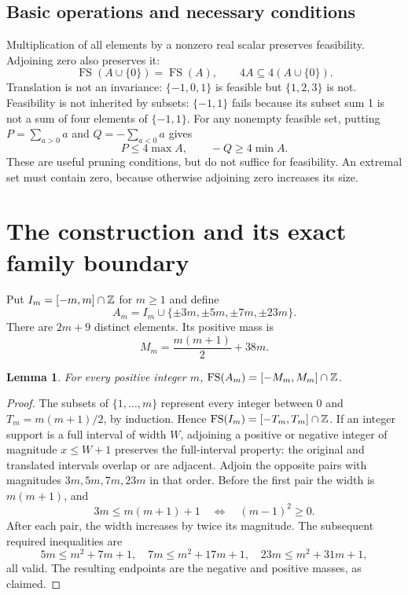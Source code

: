 \documentclass[11pt,a4paper]{article}
\newtheorem{lemma}[theorem]{Lemma}
\theoremstyle{remark}\newtheorem{remark}[theorem]{Remark}
\newcommand{\FS}{\operatorname{FS}}
\begin{document}
\subsection{Basic operations and necessary conditions}
Multiplication of all elements by a nonzero real scalar preserves feasibility. Adjoining zero also preserves it:
\[\FS(A\cup\{0\})=\FS(A),\qquad4A\subseteq4(A\cup\{0\}).\]
Translation is not an invariance: $\{-1,0,1\}$ is feasible but $\{1,2,3\}$ is not. Feasibility is not inherited by subsets: $\{-1,1\}$ fails because its subset sum 1 is not a sum of four elements of $\{-1,1\}$.
For any nonempty feasible set, putting $P=\sum_{a>0}a$ and $Q=-\sum_{a<0}a$ gives
\[P\le4\max A,\qquad -Q\ge4\min A.\]
These are useful pruning conditions, but do not suffice for feasibility. An extremal set must contain zero, because otherwise adjoining zero increases its size.

\section{The construction and its exact family boundary}
Put $I_m=[-m,m]\cap\mathbb Z$ for $m\ge1$ and define
\[ A_m=I_m\cup\{\pm3m,\pm5m,\pm7m,\pm23m\}. \]
There are $2m+9$ distinct elements. Its positive mass is
\[M_m=\frac{m(m+1)}2+38m.\]

\begin{lemma}\label{lem:fullsupport}
For every positive integer $m$, $\FS(A_m)=[-M_m,M_m]\cap\Z$.
\end{lemma}
\begin{proof}
The subsets of $\{1,\ldots,m\}$ represent every integer between 0 and $T_m=m(m+1)/2$, by induction. Hence $\FS(I_m)=[-T_m,T_m]\cap\Z$. If an integer support is a full interval of width $W$, adjoining a positive or negative integer of magnitude $x\le W+1$ preserves the full-interval property: the original and translated intervals overlap or are adjacent.
Adjoin the opposite pairs with magnitudes $3m,5m,7m,23m$ in that order. Before the first pair the width is $m(m+1)$, and
\[3m\le m(m+1)+1\quad\Longleftrightarrow\quad (m-1)^2\ge0.\]
After each pair, the width increases by twice its magnitude. The subsequent required inequalities are
\[5m\le m^2+7m+1,\quad7m\le m^2+17m+1,\quad23m\le m^2+31m+1,\]
all valid. The resulting endpoints are the negative and positive masses, as claimed.
\end{proof}
\end{document}
